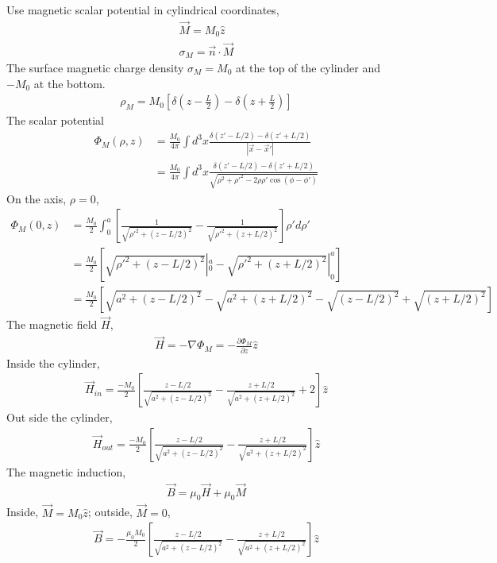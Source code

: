 \documentclass{article}
\begin{document}
Use magnetic scalar potential in cylindrical coordinates,
\begin{align*}
  \vec M=M_0\hat z\\
  \sigma_M=\vec n\cdot \vec M
\end{align*}
The surface magnetic charge density $\sigma_M=M_0$ at the top of the cylinder and $-M_0$ at the bottom.
\begin{align*}
  \rho_M=M_0[\delta(z-\frac{L}{2})-\delta(z+\frac{L}{2})]
\end{align*}
The scalar potential
\begin{align*}
  \Phi_M(\rho,z)&=\frac{M_0}{4\pi}\int d^3x\frac{\delta(z'-L/2)-\delta(z'+L/2)}{|\vec x-\vec x'|}\\
                &=\frac{M_0}{4\pi}\int d^3x\frac{\delta(z'-L/2)-\delta(z'+L/2)}{\sqrt{\rho^2+\rho'^2-2\rho\rho'\cos(\phi-\phi')}}
\end{align*}
On the axis, $\rho=0$,
\begin{align*}
  \Phi_M(0,z)&=\frac{M_0}{2}\int_0^a[\frac{1}{\sqrt{\rho'^2+(z-L/2)^2}}-\frac{1}{\sqrt{\rho'^2+(z+L/2)^2}}]\rho'd\rho'\\
             &=\frac{M_0}{2}[\sqrt{\rho'^2+(z-L/2)^2}|_0^a-\sqrt{\rho'^2+(z+L/2)^2}|_0^a]\\
             &=\frac{M_0}{2}[\sqrt{a^2+(z-L/2)^2}-\sqrt{a^2+(z+L/2)^2}-\sqrt{(z-L/2)^2}+\sqrt{(z+L/2)^2}]
\end{align*}
The magnetic field $\vec H$,
\begin{align*}
  \vec H=-\nabla\Phi_M=-\frac{\partial \Phi_M}{\partial z}\hat z
\end{align*}
Inside the cylinder,
\begin{align*}
  \vec H_{in}=\frac{-M_0}{2}[\frac{z-L/2}{\sqrt{a^2+(z-L/2)^2}}-\frac{z+L/2}{\sqrt{a^2+(z+L/2)^2}}+2]\hat z
\end{align*}
Out side the cylinder,
\begin{align*}
  \vec H_{out}=\frac{-M_0}{2}[\frac{z-L/2}{\sqrt{a^2+(z-L/2)^2}}-\frac{z+L/2}{\sqrt{a^2+(z+L/2)^2}}]\hat z
\end{align*}
The magnetic induction,
\begin{align*}
  \vec B=\mu_0\vec H+\mu_0\vec M
\end{align*}
Inside, $\vec M=M_0\hat z$; outside, $\vec M=0$,
\begin{align*}
  \vec B=-\frac{\mu_0M_0}{2}[\frac{z-L/2}{\sqrt{a^2+(z-L/2)^2}}-\frac{z+L/2}{\sqrt{a^2+(z+L/2)^2}}]\hat z
\end{align*}
% 
% 
\end{document}
